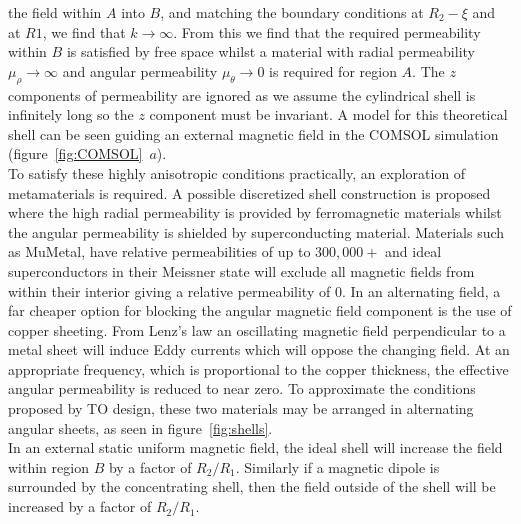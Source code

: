 \documentclass[11pt]{iopart}
\begin{document}
the field within $A$ into $B$, and matching the boundary conditions at
$R_2-\xi$ and at $R1$, we find that $k \rightarrow \infty$. From this
we find that the required permeability within $B$ is satisfied by free
space whilst a material with radial permeability $\mu_\rho \rightarrow
\infty$ and angular permeability $\mu_\theta \rightarrow 0$ is
required for region $A$. The $z$ components of permeability are ignored
as we assume the cylindrical shell is
infinitely long so the $z$ component must be invariant. A model for
this theoretical shell can be seen guiding an external magnetic field
in the COMSOL simulation (figure~\ref{fig:COMSOL}~$a$).\\ To satisfy
these highly anisotropic conditions practically, an exploration of
metamaterials is required. A possible discretized shell construction
is proposed~\cite{N2014} where the high radial permeability is
provided by ferromagnetic materials whilst the angular permeability is
shielded by superconducting material. Materials such as MuMetal, have
relative permeabilities of up to $300,000+$ and ideal
superconductors in their Meissner state will exclude all magnetic
fields from within their interior giving a relative permeability of
$0$. In an alternating field, a far cheaper option for
blocking the angular magnetic field component is the use of copper
sheeting. From Lenz's law an oscillating magnetic field perpendicular
to a metal sheet will induce Eddy currents which will oppose the
changing field. At an appropriate frequency, which is proportional to
the copper thickness, the effective angular permeability is reduced to
near zero. To approximate the conditions proposed by TO design, these
two materials may be arranged in alternating angular sheets, as seen
in figure~\ref{fig:shells}. \\ In an external static uniform magnetic
field, the ideal shell will increase the field within region $B$ by a
factor of $R_2/R_1$. Similarly if a magnetic dipole is surrounded by
the concentrating shell, then the field outside of the shell will be
increased by a factor of $R_2/R_1$. \\
\end{document}
